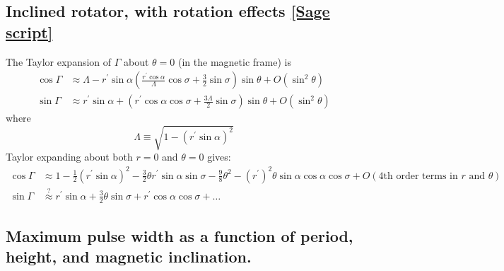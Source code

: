\documentclass{book}
\newcommand{\linktosage}[1]{\hyperref[#1]{[Sage script]}}
\begin{document}
\subsection{Inclined rotator, with rotation effects \linktosage{sage:Gamma}}

The Taylor expansion of $\Gamma$ about $\theta = 0$ (in the magnetic frame) is
\begin{equation}
    \begin{aligned}
        \cos\Gamma &\approx \Lambda - r^\prime\sin\alpha
            \left(\frac{r^\prime\cos\alpha}{\Lambda}\cos\sigma +
                  \frac32\sin\sigma\right)\sin\theta + O(\sin^2\theta) \\
        \sin\Gamma &\approx r^\prime\sin\alpha +
            \left(r^\prime\cos\alpha\cos\sigma + \frac{3\Lambda}{2}\sin\sigma\right)\sin\theta +
            O(\sin^2\theta)
    \end{aligned}
\end{equation}
where
\begin{equation}
    \Lambda \equiv \sqrt{1-(r^\prime\sin\alpha)^2}
\end{equation}
Taylor expanding about both $r = 0$ and $\theta = 0$ gives:
\begin{equation}
    \begin{aligned}
        \cos\Gamma &\approx 1 - \frac12(r^\prime\sin\alpha)^2 -
            \frac32\theta r^\prime\sin\alpha\sin\sigma -
            \frac98\theta^2 - (r^\prime)^2\theta\sin\alpha\cos\alpha\cos\sigma +
            O(\text{4th order terms in $r$ and $\theta$}) \\
        \sin\Gamma &\stackrel{?}{\approx} r^\prime\sin\alpha + \frac32\theta\sin\sigma + r^\prime\cos\alpha\cos\sigma + \dots
    \end{aligned}
\end{equation}

\subsection{Maximum pulse width as a function of period, height, and magnetic inclination.}
\end{document}
